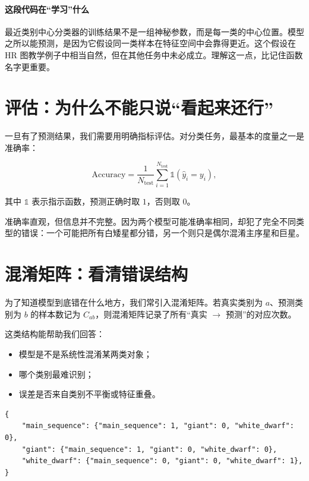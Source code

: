 \paragraph{这段代码在“学习”什么}

最近类别中心分类器的训练结果不是一组神秘参数，而是每一类的中心位置。模型之所以能预测，是因为它假设同一类样本在特征空间中会靠得更近。这个假设在 HR 图教学例子中相当自然，但在其他任务中未必成立。理解这一点，比记住函数名字更重要。

\section{评估：为什么不能只说“看起来还行”}

一旦有了预测结果，我们需要用明确指标评估。对分类任务，最基本的度量之一是准确率：

\[
\mathrm{Accuracy} =
\frac{1}{N_{\mathrm{test}}}
\sum_{i=1}^{N_{\mathrm{test}}}
\mathbb{1}(\hat{y}_i = y_i),
\]

其中 $\mathbb{1}$ 表示指示函数，预测正确时取 $1$，否则取 $0$。

准确率直观，但信息并不完整。因为两个模型可能准确率相同，却犯了完全不同类型的错误：一个可能把所有白矮星都分错，另一个则只是偶尔混淆主序星和巨星。

\section{混淆矩阵：看清错误结构}

为了知道模型到底错在什么地方，我们常引入混淆矩阵。若真实类别为 $a$、预测类别为 $b$ 的样本数记为 $C_{ab}$，则混淆矩阵记录了所有“真实 $\rightarrow$ 预测”的对应次数。

这类结构能帮助我们回答：

\begin{itemize}
    \item 模型是不是系统性混淆某两类对象；
    \item 哪个类别最难识别；
    \item 误差是否来自类别不平衡或特征重叠。
\end{itemize}

\begin{examplebox}[一个最小混淆矩阵结构]
\begin{lstlisting}[style=pythonstyle]
{
    "main_sequence": {"main_sequence": 1, "giant": 0, "white_dwarf": 0},
    "giant": {"main_sequence": 1, "giant": 0, "white_dwarf": 0},
    "white_dwarf": {"main_sequence": 0, "giant": 0, "white_dwarf": 1},
}
\end{lstlisting}
\end{examplebox}

